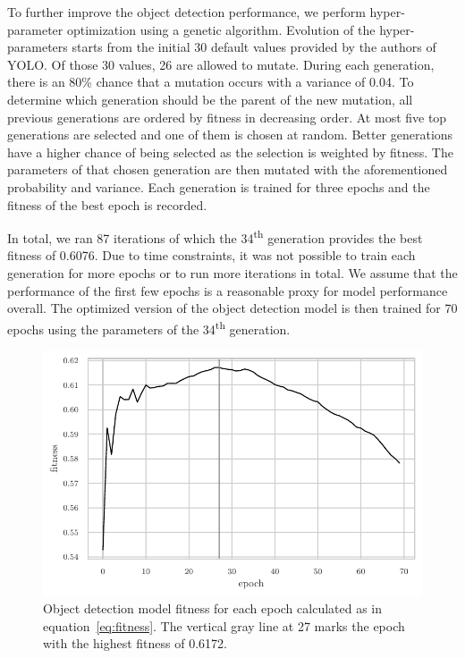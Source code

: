 \documentclass[draft,final]{vutinfth} %
\begin{document}
To further improve the object detection performance, we perform
hyper-parameter optimization using a genetic algorithm. Evolution of
the hyper-parameters starts from the initial 30 default values
provided by the authors of YOLO. Of those 30 values, 26 are allowed to
mutate. During each generation, there is an 80\% chance that a
mutation occurs with a variance of 0.04. To determine which generation
should be the parent of the new mutation, all previous generations are
ordered by fitness in decreasing order. At most five top generations
are selected and one of them is chosen at random. Better generations
have a higher chance of being selected as the selection is weighted by
fitness. The parameters of that chosen generation are then mutated
with the aforementioned probability and variance. Each generation is
trained for three epochs and the fitness of the best epoch is
recorded.

In total, we ran 87 iterations of which the 34\textsuperscript{th}
generation provides the best fitness of 0.6076. Due to time
constraints, it was not possible to train each generation for more
epochs or to run more iterations in total. We assume that the
performance of the first few epochs is a reasonable proxy for model
performance overall. The optimized version of the object detection
model is then trained for 70 epochs using the parameters of the
34\textsuperscript{th} generation.

\begin{figure}
  \centering
  \includegraphics{graphics/model_fitness_final.pdf}
  \caption[Optimized object detection fitness per epoch.]{Object
    detection model fitness for each epoch calculated as in
    equation~\ref{eq:fitness}. The vertical gray line at 27 marks the
    epoch with the highest fitness of 0.6172.}
  \label{fig:hyp-opt-fitness}
\end{figure}
\end{document}
